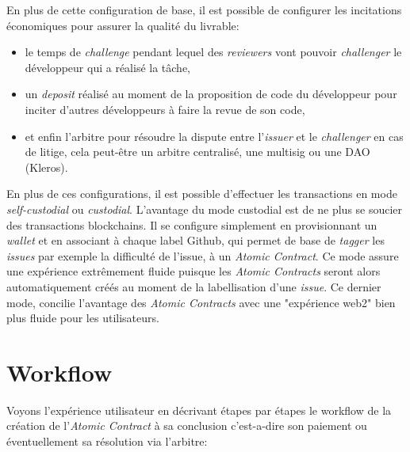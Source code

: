 \documentclass[
	a4paper, %
	10pt, %
	unnumberedsections, %
	twoside, %
]{LTJournalArticle}
\begin{document}
En plus de cette configuration de base, il est possible de configurer les incitations économiques pour assurer la qualité du livrable:

\begin{itemize}
\item
  le temps de \emph{challenge} pendant lequel des \emph{reviewers} vont pouvoir \emph{challenger} le développeur qui a réalisé la tâche,
\item
  un \emph{deposit} réalisé au moment de la proposition de code du développeur pour inciter d'autres développeurs à faire la revue de son code,
\item
  et enfin l'arbitre pour résoudre la dispute entre l'\emph{issuer} et le \emph{challenger} en cas de litige, cela peut-être un arbitre centralisé, une multisig ou une DAO (Kleros).
\end{itemize}

En plus de ces configurations, il est possible d'effectuer les transactions en mode \emph{self-custodial} ou \emph{custodial}. L'avantage du mode custodial est de ne plus se soucier des transactions blockchains. Il se configure simplement en provisionnant un \emph{wallet} et en associant à chaque label Github, qui permet de base de \emph{tagger} les \emph{issues} par exemple la difficulté de l'issue, à un \emph{Atomic Contract}. Ce mode assure une expérience extrêmement fluide puisque les \emph{Atomic Contracts} seront alors automatiquement créés au moment de la labellisation d'une \emph{issue}. Ce dernier mode, concilie l'avantage des \emph{Atomic Contracts} avec une "expérience web2" bien plus fluide pour les utilisateurs.


\section{Workflow}

Voyons l'expérience utilisateur en décrivant étapes par étapes le workflow de la création de l'\emph{Atomic Contract} à sa conclusion c'est-a-dire son paiement ou éventuellement sa résolution via l'arbitre:
\end{document}

